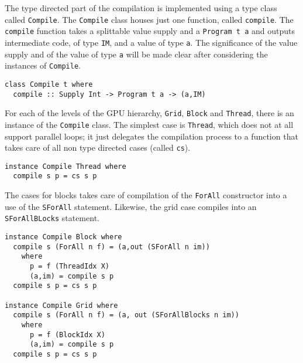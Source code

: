 The type directed part of the compilation is implemented using a type class 
called {\tt Compile}. The {\tt Compile} class houses just one function, called
{\tt compile}. The {\tt compile} function takes a splittable value supply and 
a {\tt Program t a} and outputs intermediate code, of type {\tt IM}, and a 
value of type {\tt a}. The significance of the value supply and of the value 
of type {\tt a} will be made clear after considering the instances of 
{\tt Compile}.  

\begin{small} 
\begin{Verbatim}[samepage=true] 
class Compile t where
  compile :: Supply Int -> Program t a -> (a,IM)
\end{Verbatim} 
\end{small} 

For each of the levels of the GPU hierarchy, {\tt Grid}, {\tt Block} and {\tt Thread},
there is an instance of the {\tt Compile} class. The simplest case is {\tt Thread},
which does not at all support parallel loops; it just delegates the compilation 
process to a function that takes care of all non type directed cases (called {\tt cs}).



\begin{small} 
\begin{Verbatim}[samepage=true] 
instance Compile Thread where 
  compile s p = cs s p 
\end{Verbatim} 
\end{small} 

The cases for blocks takes care of compilation of the {\tt ForAll} 
constructor into a use of the {\tt SForAll} statement. Likewise, the 
grid case compiles into an {\tt SForAllBLocks} statement. 


\begin{small} 
\begin{Verbatim}[samepage=true] 
instance Compile Block where
  compile s (ForAll n f) = (a,out (SForAll n im))
    where
      p = f (ThreadIdx X)
      (a,im) = compile s p
  compile s p = cs s p 

instance Compile Grid where
  compile s (ForAll n f) = (a, out (SForAllBlocks n im))
    where 
      p = f (BlockIdx X)
      (a,im) = compile s p
  compile s p = cs s p

\end{Verbatim} 
\end{small} 

